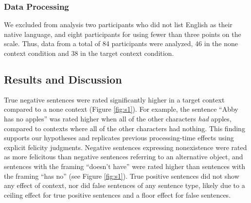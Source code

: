\documentclass[10pt,letterpaper]{article}
\begin{document}
\subsubsection{Data Processing}

We excluded from analysis two participants who did not list English as their native language, and eight participants for using fewer than three points on the scale.  Thus, data from a total of 84 participants were analyzed, 46 in the none context condition and 38 in the target context condition.  

\subsection{Results and Discussion}


True negative sentences were rated significantly higher in a target context compared to a none context (Figure \ref{fig:s1}). For example, the sentence ``Abby has no apples'' was rated higher when all of the other characters \emph{had} apples, compared to contexts where all of the other characters had nothing. This finding supports our hypotheses and replicates previous processing-time effects using explicit felicity judgments.  Negative sentences expressing nonexistence were rated as more felicitous than negative sentences referring to an alternative object, and sentences with the framing ``doesn't have'' were rated higher than sentences with the framing ``has no'' (see Figure \ref{fig:s1}). True positive sentences did not show any effect of context, nor did false sentences of any sentence type, likely due to a ceiling effect for true positive sentences and a floor effect for false sentences.  

\end{document}

